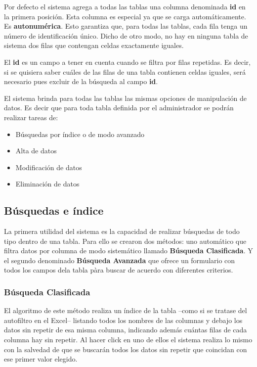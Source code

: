 \documentclass[a4paper,10pt]{article}
\begin{document}
Por defecto el sistema agrega a todas las tablas una columna denominada \textbf{id} en la primera posición. Esta columna es especial ya que se carga automáticamente. Es \textbf{autonumérica}. Esto garantiza que, para todas las tablas, cada fila tenga un número de identificación único. Dicho de otro modo, no hay en ninguna tabla de sistema dos filas que contengan celdas exactamente iguales.

El \textbf{id} es un campo a tener en cuenta cuando se filtra por filas repetidas. Es decir, si se quisiera saber cuáles de las filas de una tabla contienen celdas iguales, será necesario pues excluir de la búsqueda al campo \textbf{id}.

El sistema brinda para todas las tablas las mismas opciones de manipulación de datos. Es decir que para toda tabla definida por el administrador se podrán realizar tareas de:

\begin{itemize}
 \item Búsquedas por índice o de modo avanzado
 \item Alta de datos
 \item Modificación de datos 
 \item Eliminación de datos
\end{itemize}


\subsection{Búsquedas e índice}

La primera utilidad del sistema es la capacidad de realizar búsquedas de todo tipo dentro de una tabla. 
Para ello se crearon dos métodos: uno automático que filtra datos por columna de modo sistemático llamado \textbf{Búsqueda Clasificada}. Y el segundo denominado \textbf{Búsqueda Avanzada} que ofrece un formulario con todos los campos dela tabla pàra buscar de acuerdo con diferentes criterios.

\subsubsection{Búsqueda Clasificada}

El algoritmo de este método realiza un índice de la tabla --como si se tratase del autofiltro en el Excel-- listando todos los nombres de las columnas y debajo los datos sin repetir de esa misma columna, indicando además cuántas filas de cada columna hay sin repetir. Al hacer click en uno de ellos el sistema realiza lo mismo con la salvedad de que se buscarán todos los datos sin repetir que coincidan con ese primer valor elegido.
\end{document}
